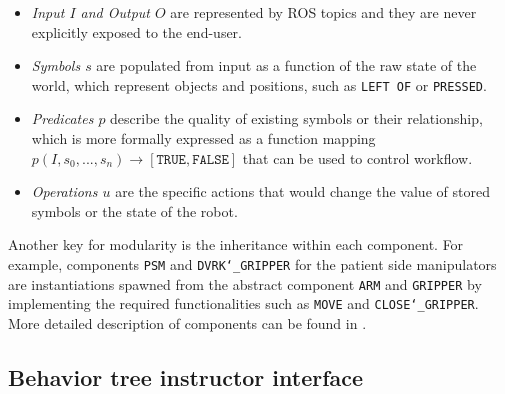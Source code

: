 \documentclass[letterpaper, 10 pt, conference]{ieeeconf}
\begin{document}
\begin{itemize}
\item \textit{Input $I$ and Output $O$} are represented by ROS topics and they are never explicitly exposed to the end-user. 
\item \textit{Symbols $s$} are populated from input as a function of the raw state of the world, which represent objects and positions, such as \texttt{LEFT OF} or \texttt{PRESSED}.
\item \textit{Predicates $p$} describe the quality of existing symbols or their relationship, which is more formally expressed as a function mapping $p(I,s_0, ..., s_n) \rightarrow [\texttt{TRUE}, \texttt{FALSE}]$ that can be used to control workflow. 
\item \textit{Operations $u$} are the specific actions that would change the value of stored symbols or the state of the robot. 

\end{itemize}

Another key for modularity is the inheritance within each component. For example, components \texttt{PSM} and \texttt{DVRK\char`_GRIPPER} for the patient side manipulators are instantiations spawned from the abstract component \texttt{ARM} and \texttt{GRIPPER} by implementing the required functionalities such as \texttt{MOVE} and \texttt{CLOSE\char`_GRIPPER}. More detailed description of components can be found in \cite{paxton2017costar}.

\subsection{Behavior tree instructor interface}

%
%
\end{document}
